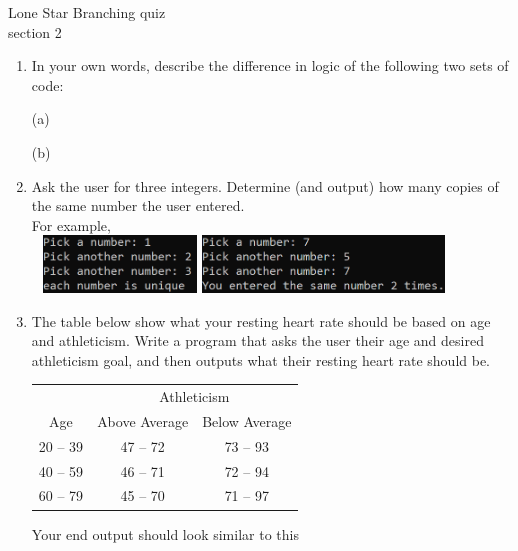 \documentclass{article}
\begin{document}
\pagebreak
Lone Star \hfill Branching quiz\\
section 2\\
\begin{enumerate}
	\item 
		In your own words, describe the difference in logic of the following two sets of code:\\
		\begin{minipage}{.5\textwidth}
			(a) \mbox{\hspace*{2em} }
		\end{minipage}
		\begin{minipage}{.5\textwidth}
			(b) \mbox{\hspace*{2em} }
		\end{minipage}


	\item 
		Ask the user for three integers.  Determine (and output) how many copies of the same number 
		the user entered.\\
		For example, \\ \ \hfill
		\includegraphics[height = 0.6in]{./imgs/uniqueIntCount1.PNG} \hfill
		\includegraphics[height = 0.6in]{./imgs/uniqueIntCount2.PNG} \hfill \ 

	
	\item 
		The table below show what your resting heart rate should be based on age and athleticism.  
		Write a program that asks the user their age and desired athleticism goal, and then outputs 
		what their resting heart rate should be.

		\begin{minipage}{.45\textwidth}
			\begin{tabular}{c|cc}
				& \multicolumn{2}{c}{Athleticism}\\
				Age & Above Average & Below Average \\ \hline
				20 -- 39 & 47 -- 72 & 73 -- 93\\
				40 -- 59 & 46 -- 71 & 72 -- 94\\
				60 -- 79 & 45 -- 70 & 71 -- 97 \\
			\end{tabular}
		\end{minipage}
		\begin{minipage}{.45\textwidth}
			\vspace*{1em}
			Your end output should look similar to this
		\end{minipage}


\end{enumerate}
\end{document}
